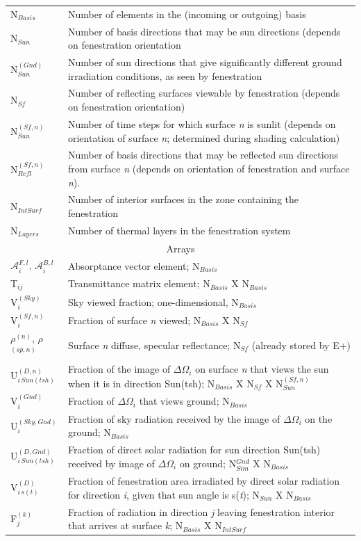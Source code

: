 \begin{longtable}[c]{p{1.5in}p{4.5in}}
N\(_{Basis}\) & Number of elements in the (incoming or outgoing) basis \tabularnewline
N\(_{Sun}\) & Number of basis directions that may be sun directions (depends on fenestration orientation \tabularnewline
N\(^{(Gnd)}_{Sun}\) & Number of sun directions that give significantly different ground irradiation conditions, as seen by fenestration \tabularnewline
N\(_{Sf}\) & Number of reflecting surfaces viewable by fenestration (depends on fenestration orientation) \tabularnewline
N\(^{(Sf,n)}_{Sun}\) & Number of time steps for which surface \emph{n} is sunlit (depends on orientation of surface \emph{n}; determined during shading calculation) \tabularnewline
N\(^{(Sf,n)}_{Refl}\) & Number of basis directions that may be reflected sun directions from surface \emph{n} (depends on orientation of fenestration and surface \emph{n}). \tabularnewline
N\(_{IntSurf}\) & Number of interior surfaces in the zone containing the fenestration \tabularnewline
N\(_{Layers}\) & Number of thermal layers in the fenestration system \tabularnewline
\midrule
\multicolumn{2}{c}{Arrays} \tabularnewline
\midrule
\(\mathcal{A}\)\(^{F,l}_{i}\), \(\mathcal{A}\)\(^{B,l}_{i}\) & Absorptance vector element; N\(_{Basis}\) \tabularnewline
T\(_{ij}\) & Transmittance matrix element; N\(_{Basis}\) X N\(_{Basis}\) \tabularnewline
V\(^{(Sky)}_{i}\) & Sky viewed fraction; one-dimensional, N\(_{Basis}\) \tabularnewline
V\(^{(Sf,n)}_{i}\) & Fraction of surface \emph{n} viewed; N\(_{Basis}\) X N\(_{Sf}\) \tabularnewline
$\rho$\(^{(n)}\), $\rho$\(^{(sp,n)}\) & Surface \emph{n} diffuse, specular reflectance; N\(_{Sf}\) (already stored by E+) \tabularnewline
U\(^{(D,n)}_{i\,Sun(tsh)}\) & Fraction of the image of $\Delta\Omega$\(_{i}\) on surface \emph{n} that views the sun when it is in direction Sun(tsh); N\(_{Basis}\) X N\(_{Sf}\) X N\(^{(Sf,n)}_{Sun}\) \tabularnewline
V\(^{(Gnd)}_{i}\) & Fraction of $\Delta\Omega$\(_{i}\) that views ground; N\(_{Basis}\) \tabularnewline
U\(^{(Sky, Gnd)}_{i}\) & Fraction of sky radiation received by the image of $\Delta\Omega$\(_{i}\) on the ground; N\(_{Basis}\) \tabularnewline
U\(^{(D,Gnd)}_{i\,Sun(tsh)}\) & Fraction of direct solar radiation for sun direction Sun(tsh) received by image of $\Delta\Omega$\(_{i}\) on ground; N\(^{Gnd}_{Sim}\) X N\(_{Basis}\) \tabularnewline
V\(^{(D)}_{i\,s(t)}\) & Fraction of fenestration area irradiated by direct solar radiation for direction \emph{i}, given that sun angle is s(\emph{t}); N\(_{Sun}\) X N\(_{Basis}\) \tabularnewline
F\(^{(k)}_{j}\) & Fraction of radiation in direction \emph{j} leaving fenestration interior that arrives at surface \emph{k}; N\(_{Basis}\) X N\(_{IntSurf}\) \tabularnewline

\end{longtable}
